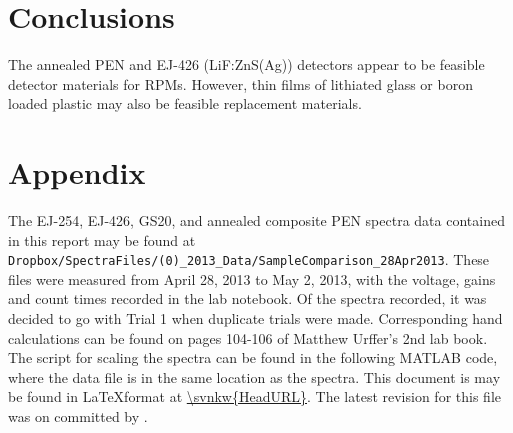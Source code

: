 \documentclass[onecolumn]{IEEEtran}
\begin{document}
\section{Conclusions}
The annealed PEN and EJ-426 (LiF:ZnS(Ag)) detectors appear to be feasible detector materials for RPMs.
However, thin films of lithiated glass or boron loaded plastic may also be feasible replacement materials.
\section{Appendix}
The EJ-254, EJ-426, GS20, and annealed composite PEN spectra data contained in this report may be found at \verb+Dropbox/SpectraFiles/(0)_2013_Data/SampleComparison_28Apr2013+.
These files were measured from April 28, 2013 to May 2, 2013, with the voltage, gains and count times recorded in the lab notebook. 
Of the spectra recorded, it was decided to go with Trial 1 when duplicate trials were made.
Corresponding hand calculations can be found on pages 104-106 of Matthew Urffer's 2nd lab book.
The script for scaling the spectra can be found in the following MATLAB code, where the data file is in the same location as the spectra.
This document is may be found in \LaTeX format at \url{\svnkw{HeadURL}}.  The latest revision for this file was \svnrev on \svndate committed by \svnauthor.
\end{document}
